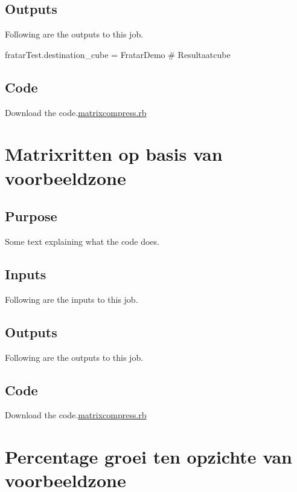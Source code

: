 \documentclass[
  letterpaper,
  DIV=11,
  numbers=noendperiod]{scrreprt}
\newenvironment{Shaded}{\begin{snugshade}}{\end{snugshade}}
\newcommand{\AttributeTok}[1]{\textcolor[rgb]{0.40,0.45,0.13}{#1}}
\newcommand{\CommentTok}[1]{\textcolor[rgb]{0.37,0.37,0.37}{#1}}
\newcommand{\KeywordTok}[1]{\textcolor[rgb]{0.00,0.23,0.31}{#1}}
\newcommand{\NormalTok}[1]{\textcolor[rgb]{0.00,0.23,0.31}{#1}}
\newcommand{\VerbatimStringTok}[1]{\textcolor[rgb]{0.13,0.47,0.30}{#1}}
\begin{document}
\subsection{Outputs}

Following are the outputs to this job.

\begin{Shaded}
\begin{Highlighting}[]
\NormalTok{fratarTest}\AttributeTok{.destination\_cube} \KeywordTok{=} \VerbatimStringTok{\textquotesingle{}FratarDemo\textquotesingle{}} \CommentTok{\# Resultaatcube }
\end{Highlighting}
\end{Shaded}

\subsection{Code}

Download the code.\href{../../first.rb}{matrixcompress.rb}

\section{Matrixritten op basis van
voorbeeldzone}\label{matrixritten-op-basis-van-voorbeeldzone}

\subsection{Purpose}

Some text explaining what the code does.

\subsection{Inputs}

Following are the inputs to this job.

\subsection{Outputs}

Following are the outputs to this job.

\subsection{Code}

Download the code.\href{../first.rb}{matrixcompress.rb}

\section{Percentage groei ten opzichte van
voorbeeldzone}\label{percentage-groei-ten-opzichte-van-voorbeeldzone}
\end{document}
